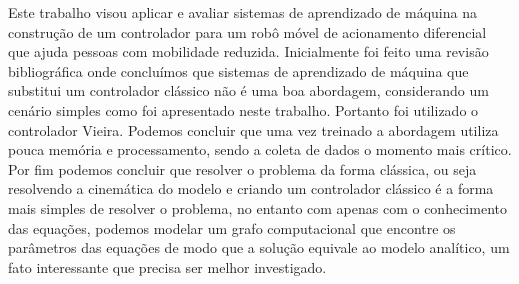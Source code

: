 
\label{Cap:Conclusao}

Este trabalho visou aplicar e avaliar sistemas de aprendizado de máquina
na construção de um controlador para um robô móvel de acionamento diferencial
que ajuda pessoas com mobilidade reduzida. Inicialmente foi feito uma
revisão bibliográfica onde concluímos que sistemas de aprendizado de
máquina que substitui um controlador clássico não é uma boa abordagem,
considerando um cenário simples como foi apresentado neste trabalho.
Portanto foi utilizado o controlador Vieira.
Podemos concluir que uma vez treinado a abordagem utiliza pouca memória
e processamento,
sendo a coleta de dados o momento mais crítico. Por fim podemos concluir
que resolver o problema da forma clássica, ou seja resolvendo a cinemática
do modelo e criando um controlador clássico é a forma mais simples
de resolver o problema, no entanto com apenas com o conhecimento das equações,
podemos modelar um grafo computacional que encontre os parâmetros das
equações de modo que a solução equivale ao modelo analítico, um fato
interessante que precisa ser melhor investigado.